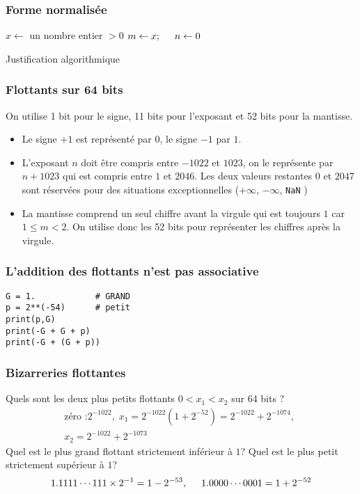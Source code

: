 \begin{frame}
  \frametitle{Forme normalisée}
\begin{algorithm}[H]
  $x \leftarrow $ un nombre entier $>0$\;
  $m \leftarrow x ; \hspace{0.5cm} n \leftarrow 0$\;
  \caption{Justification algorithmique}
\end{algorithm}
\end{frame}


\begin{frame}
\frametitle{Flottants sur 64 bits}
On utilise 1 bit pour le signe, 11 bits pour l'exposant et 52 bits pour la mantisse.
\begin{itemize}
 \item Le signe $+1$ est représenté par $0$, le signe $-1$ par $1$.
 \item L'exposant $n$ doit être compris entre $-1022$ et $1023$, on le représente par $n + 1023$ qui est compris entre $1$ et $2046$. Les deux valeurs restantes $0$ et $2047$ sont réservées pour des situations exceptionnelles ($+\infty$, $-\infty$, \texttt{NaN} )
 \item La mantisse comprend un seul chiffre avant la virgule qui est toujours $1$ car $1\leq m <2$. On utilise donc les 52 bits pour représenter les chiffres après la virgule. 
\end{itemize}  
\end{frame}

\begin{frame}[fragile]
  \frametitle{L'addition des flottants n'est pas associative}
\begin{verbatim}
G = 1.            # GRAND
p = 2**(-54)      # petit
print(p,G)
print(-G + G + p)
print(-G + (G + p))
\end{verbatim}


\end{frame}


\begin{frame}
  \frametitle{Bizarreries flottantes}
Quels sont les deux plus petits flottants $0<x_1<x_2$ sur 64 bits ?
\begin{multline*}
  \text{zéro :} 2^{-1022},\; x_1 = 2^{-1022}(1 + 2^{-52}) = 2^{-1022} + 2^{-1074},\;\\ x_2 = 2^{-1022} + 2^{-1073}  
\end{multline*}
Quel est le plus grand flottant strictement inférieur à $1$? Quel est le plus petit strictement supérieur à $1$?
\begin{displaymath}
  1.1111\cdots 111 \times 2^{-1} = 1 -2^{-53},\hspace{0.5cm} 1.0000 \cdots 0001 = 1+2^{-52}
\end{displaymath}

\end{frame}


